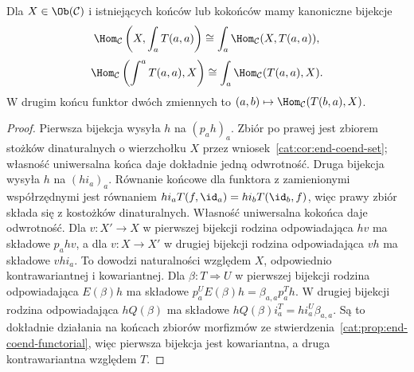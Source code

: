 \begin{wniosek}\label{cat:cor:hom-end}
Dla $X\in\Ob(\mathcal C)$ i istniejących końców lub kokońców mamy kanoniczne bijekcje
\[
 \Hom_{\mathcal C}\left(X,\int_a T(a,a)\right)
 \cong \int_a\Hom_{\mathcal C}(X,T(a,a)),
\]
\[
 \Hom_{\mathcal C}\left(\int^a T(a,a),X\right)
 \cong \int_a\Hom_{\mathcal C}(T(a,a),X).
\]
W drugim końcu funktor dwóch zmiennych to $(a,b)\mapsto\Hom_{\mathcal C}(T(b,a),X)$.
\end{wniosek}
\begin{proof}
Pierwsza bijekcja wysyła $h$ na $(p_a h)_a$. Zbiór po prawej jest zbiorem stożków dinaturalnych o wierzchołku $X$ przez wniosek~\ref{cat:cor:end-coend-set}; własność uniwersalna końca daje dokładnie jedną odwrotność. Druga bijekcja wysyła $h$ na $(h i_a)_a$. Równanie końcowe dla funktora z zamienionymi współrzędnymi jest równaniem $h i_a T(f,\id_a)=h i_b T(\id_b,f)$, więc prawy zbiór składa się z kostożków dinaturalnych. Własność uniwersalna kokońca daje odwrotność. Dla $v:X'\to X$ w pierwszej bijekcji rodzina odpowiadająca $hv$ ma składowe $p_a hv$, a dla $v:X\to X'$ w drugiej bijekcji rodzina odpowiadająca $vh$ ma składowe $vh i_a$. To dowodzi naturalności względem $X$, odpowiednio kontrawariantnej i kowariantnej. Dla $\beta:T\Rightarrow U$ w pierwszej bijekcji rodzina odpowiadająca $E(\beta)h$ ma składowe $p^U_a E(\beta)h=\beta_{a,a}p^T_a h$. W drugiej bijekcji rodzina odpowiadająca $hQ(\beta)$ ma składowe $hQ(\beta)i^T_a=h i^U_a\beta_{a,a}$. Są to dokładnie działania na końcach zbiorów morfizmów ze stwierdzenia~\ref{cat:prop:end-coend-functorial}, więc pierwsza bijekcja jest kowariantna, a druga kontrawariantna względem $T$.
\end{proof}

